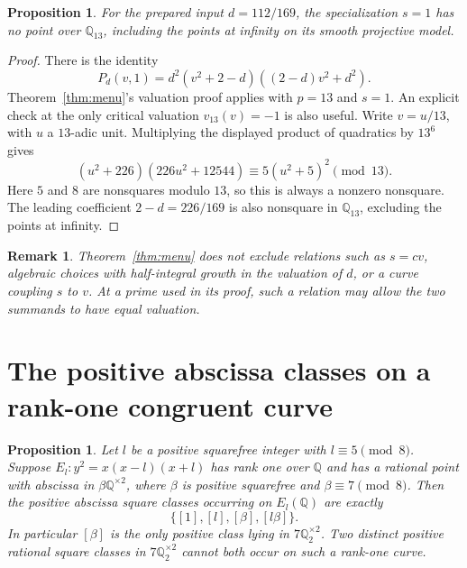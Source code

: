 \documentclass[11pt]{article}
\newtheorem{proposition}[theorem]{Proposition}
\newtheorem{remark}[theorem]{Remark}
\newcommand{\Q}{\mathbb Q}
\begin{document}
\begin{proposition}\label{prop:small}
For the prepared input $d=112/169$, the specialization $s=1$ has no point over $\Q_{13}$, including the points at infinity on its smooth projective model.
\end{proposition}
\begin{proof}
There is the identity
\[
 P_d(v,1)=d^2(v^2+2-d)((2-d)v^2+d^2).
\]
Theorem~\ref{thm:menu}'s valuation proof applies with $p=13$ and $s=1$. An explicit check at the only critical valuation $v_{13}(v)=-1$ is also useful. Write $v=u/13$, with $u$ a $13$-adic unit. Multiplying the displayed product of quadratics by $13^6$ gives
\[
 (u^2+226)(226u^2+12544)
 \equiv5(u^2+5)^2\pmod{13}.
\]
Here $5$ and $8$ are nonsquares modulo $13$, so this is always a nonzero nonsquare. The leading coefficient $2-d=226/169$ is also nonsquare in $\Q_{13}$, excluding the points at infinity.
\end{proof}

\begin{remark}
Theorem~\ref{thm:menu} does not exclude relations such as $s=cv$, algebraic choices with half-integral growth in the valuation of $d$, or a curve coupling $s$ to $v$. At a prime used in its proof, such a relation may allow the two summands to have equal valuation.
\end{remark}

\section{The positive abscissa classes on a rank-one congruent curve}

\begin{proposition}\label{prop:rankone}
Let $l$ be a positive squarefree integer with $l\equiv5\pmod8$. Suppose $E_l:y^2=x(x-l)(x+l)$ has rank one over $\Q$ and has a rational point with abscissa in $\beta\Q^{\times2}$, where $\beta$ is positive squarefree and $\beta\equiv7\pmod8$. Then the positive abscissa square classes occurring on $E_l(\Q)$ are exactly
\[
 \{[1],[l],[\beta],[l\beta]\}.
\]
In particular $[\beta]$ is the only positive class lying in $7\Q_2^{\times2}$. Two distinct positive rational square classes in $7\Q_2^{\times2}$ cannot both occur on such a rank-one curve.
\end{proposition}
\end{document}
